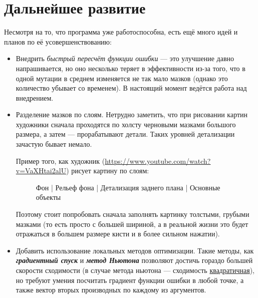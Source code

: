 \documentclass[11pt]{article}
\begin{document}
    \section{Дальнейшее развитие}\label{sec:todo}
    Несмотря на то, что программа уже работоспособна, есть ещё много идей и планов по её усовершенствованию:
    \begin{itemize}
        \item Внедрить \textit{быстрый пересчёт функции ошибки} — это улучшение давно напрашивается,
                но оно несколько теряет в эффективности из-за того, что в одной мутации в среднем изменяется
                не так мало мазков (однако это количество убывает со временем).
                В настоящий момент ведётся работа над внедрением.
        \item Разделение мазков по слоям.
                Нетрудно заметить, что при рисовании картин художники сначала проходятся по холсту черновыми мазками большого размера, а затем — прорабатывают детали.
                Таких уровней детализации зачастую бывает немало.

        Пример того, как художник (\href{https://www.youtube.com/watch?v=VaXHtai2alU}{https://www.youtube.com/watch?v=VaXHtai2alU}) рисует картину по слоям:


        \begin{figure}[h!]
            \centering
            \caption{ Фон | Рельеф фона | Детализация заднего плана | Основные объекты}
            \label{fig:layered_painting}
        \end{figure}


                Поэтому стоит попробовать сначала заполнять картинку толстыми, грубыми мазками
                (то есть просто с большей шириной, а в реальной жизни это будет отражаться в большем размере кисти и в более сильном нажатии).
        \item Добавить использование локальных методов оптимизации.
                Такие методы, как \textbf\textit{{градиентный спуск}} и \textbf\textit{{метод Ньютона}} позволяют достичь гораздо большей скорости сходимости
                (в случае метода ньютона — сходимость \href{http://w.ict.nsc.ru/books/textbooks/akhmerov/mo_unicode/4.html}{квадратичная}),
                но требуют умения посчитать градиент функции ошибки в любой точке, а также вектор вторых производных по каждому из аргументов.


\end{itemize}
\end{document}

